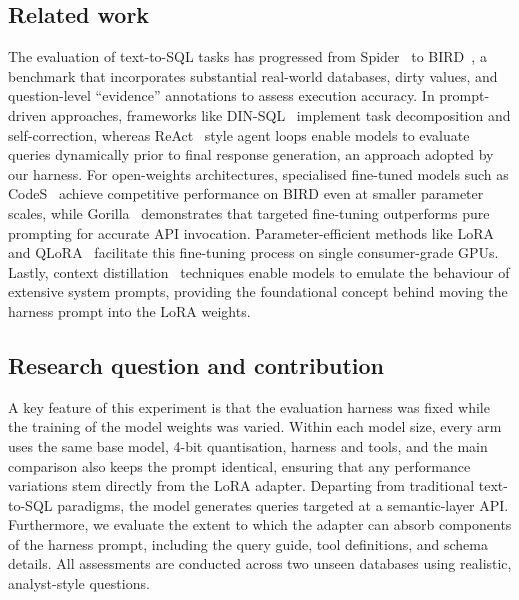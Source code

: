\subsection{Related work}
The evaluation of text-to-SQL tasks has progressed from Spider~\cite{yu2018spider} to BIRD~\cite{li2023bird}, a benchmark that incorporates substantial real-world databases, dirty values, and question-level ``evidence'' annotations to assess execution accuracy. In prompt-driven approaches, frameworks like DIN-SQL~\cite{pourreza2023din} implement task decomposition and self-correction, whereas ReAct~\cite{yao2023react} style agent loops enable models to evaluate queries dynamically prior to final response generation, an approach adopted by our harness. For open-weights architectures, specialised fine-tuned models such as CodeS~\cite{li2024codes} achieve competitive performance on BIRD even at smaller parameter scales, while Gorilla~\cite{patil2023gorilla} demonstrates that targeted fine-tuning outperforms pure prompting for accurate API invocation. Parameter-efficient methods like LoRA~\cite{hu2021lora} and QLoRA~\cite{dettmers2023qlora} facilitate this fine-tuning process on single consumer-grade GPUs. Lastly, context distillation~\cite{askell2021general,snell2022distilling} techniques enable models to emulate the behaviour of extensive system prompts, providing the foundational concept behind moving the harness prompt into the LoRA weights.


\subsection{Research question and contribution}

A key feature of this experiment is that the evaluation harness was fixed while the training of the model weights was varied. Within each model size, every arm uses the same base model, 4-bit quantisation, harness and tools, and the main comparison also keeps the prompt identical, ensuring that any performance variations stem directly from the LoRA adapter. Departing from traditional text-to-SQL paradigms, the model generates queries targeted at a semantic-layer API. Furthermore, we evaluate the extent to which the adapter can absorb components of the harness prompt, including the query guide, tool definitions, and schema details. All assessments are conducted across two unseen databases using realistic, analyst-style questions.


